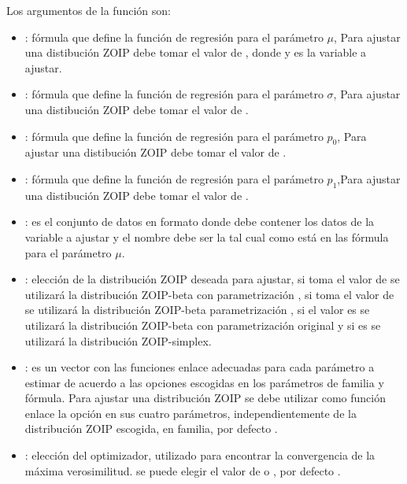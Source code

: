 Los argumentos de la funci\'{o}n  son:

\begin{itemize}[noitemsep, nolistsep]

\item {}: f\'{o}rmula que define la funci\'{o}n de regresi\'{o}n para el par\'{a}metro $\mu$, Para ajustar una distibuci\'{o}n ZOIP debe tomar el valor de , donde y es la variable a ajustar.
\item {}: f\'{o}rmula que define la funci\'{o}n de regresi\'{o}n para el par\'{a}metro $\sigma$, Para ajustar una distibuci\'{o}n ZOIP debe tomar el valor de .
\item {}: f\'{o}rmula que define la funci\'{o}n de regresi\'{o}n para el par\'{a}metro $p_0$, Para ajustar una distibuci\'{o}n ZOIP debe tomar el valor de .
\item {}: f\'{o}rmula que define la funci\'{o}n de regresi\'{o}n para el par\'{a}metro $p_1$,Para ajustar una distibuci\'{o}n ZOIP debe tomar el valor de .
\item {}: es el conjunto de datos en formato  donde debe contener los datos de la variable a ajustar y el nombre debe ser la tal cual como est\'{a} en las f\'{o}rmula para el par\'{a}metro $\mu$.
\item {}: elecci\'{o}n de la distribuci\'{o}n ZOIP deseada para ajustar, si toma el valor de  se utilizar\'{a} la distribuci\'{o}n ZOIP-beta con parametrizaci\'{o}n  \cite{Stasinopoulos2}, si toma el valor de  se utilizar\'{a} la distribuci\'{o}n ZOIP-beta parametrizaci\'{o}n \cite{Ferrari2}, si el valor es  se utilizar\'{a} la distribuci\'{o}n ZOIP-beta con parametrizaci\'{o}n original y si es  se utilizar\'{a} la distribuci\'{o}n ZOIP-simplex.
\item {}: es un vector con las funciones enlace adecuadas para cada par\'{a}metro a estimar de acuerdo a las opciones escogidas en los par\'{a}metros de familia y f\'{o}rmula. Para ajustar una distribuci\'{o}n ZOIP se debe utilizar como funci\'{o}n enlace la opci\'{o}n  en sus cuatro par\'{a}metros, independientemente de la distribuci\'{o}n ZOIP escogida, en familia, por defecto .
\item {}: elecci\'{o}n del optimizador, utilizado para encontrar la convergencia de la m\'{a}xima verosimilitud. se puede elegir el valor de  o , por defecto .
\end{itemize}

